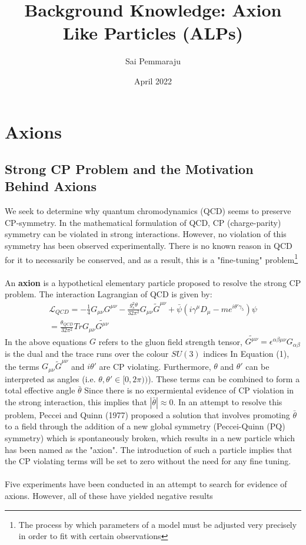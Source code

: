 \documentclass{article}
\title{\textbf{Background Knowledge: Axion Like Particles (ALPs)}}
\author{Sai Pemmaraju}
\date{April 2022}
\begin{document}
\maketitle

\section{Axions}
\subsection{Strong CP Problem and the Motivation Behind Axions}
We seek to determine why quantum chromodynamics (QCD) seems to preserve CP-symmetry. In the mathematical formulation of QCD, CP (charge-parity) symmetry can be violated in strong interactions.
However, no violation of this symmetry has been observed experimentally. There is no known reason in QCD for it to necessarily be conserved, and as a result, this is a "fine-tuning" problem\footnote{The process by which parameters of a model must be adjusted very precisely in order to fit with certain observations}\\
\\
An \textbf{axion} is a hypothetical elementary particle proposed to 
resolve the strong CP problem. The interaction Lagrangian of QCD is given by:
\begin{eqnarray}
    \mathcal{L}_{QCD} = -\frac{1}{4}G_{\mu\nu}G^{\mu\nu}-\frac{g_{s}^{2}\theta}{32\pi^{2}}G_{\mu\nu}\tilde{G}^{\mu\nu}+\bar{\psi}(i\gamma^{\mu}D_{\mu}-me^{i\theta'\gamma_{5}})\psi\\
    = \frac{\theta_{QCD}}{32\pi^{2}} Tr G_{\mu\nu}\tilde{G^{\mu\nu}}
\end{eqnarray}
In the above equations $G$ refers to the gluon field strength tensor, $\tilde{G^{\mu\nu}} = \epsilon^{\alpha\beta\mu\nu}G_{\alpha\beta}$ is the dual and the trace runs over the colour $SU(3)$ indices
In Equation (1), the terms $G_{\mu\nu}\tilde{G}^{\mu\nu}$ and $i\theta'$ are CP violating. Furthermore, $\theta$ and $\theta'$ can be interpreted as angles (i.e. $\theta, \theta'\in[0,2\pi))$). These terms can be combined to form a total effective angle $\bar{\theta}$
Since there is no expermiental evidence of CP violation in the strong interaction, this implies that $|\bar{\theta}|\approx 0$. In an attempt to resolve this problem, Peccei and Quinn (1977) proposed a solution that involves promoting $\bar{\theta}$ to a field through the addition of 
a new global symmetry (Peccei-Quinn (PQ) symmetry) which is spontaneously broken, which results in a new particle which has been named as the "axion". The introduction of such a particle implies that the CP violating terms will be set to zero without the need for any fine tuning.\\
\\
Five experiments have been conducted in an attempt to search for evidence of axions. However, all of these have yielded negative results
\end{document}
